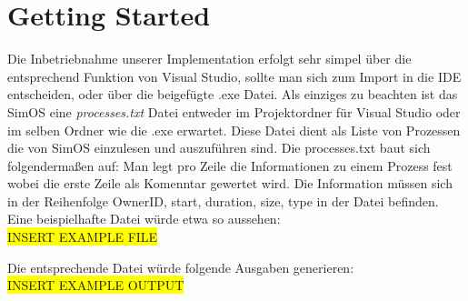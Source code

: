 \section{Getting Started}
Die Inbetriebnahme unserer Implementation erfolgt sehr simpel über die entsprechend Funktion von Visual Studio, sollte man sich zum Import in die IDE entscheiden, oder über die beigefügte .exe Datei.
Als einziges zu beachten ist das SimOS eine \textit{processes.txt} Datei entweder im Projektordner für Visual Studio oder im selben Ordner wie die .exe erwartet. Diese Datei dient als Liste von Prozessen die von SimOS einzulesen und auszuführen sind.
Die processes.txt baut sich folgendermaßen auf: Man legt pro Zeile die Informationen zu einem Prozess fest wobei die erste Zeile als Komenntar gewertet wird. Die Information müssen sich in der Reihenfolge OwnerID, start, duration, size, type in der Datei befinden. 
Eine beispielhafte Datei würde etwa so aussehen: \\
\colorbox{yellow}{INSERT EXAMPLE FILE}

Die entsprechende Datei würde folgende Ausgaben generieren:\\
\colorbox{yellow}{INSERT EXAMPLE OUTPUT}